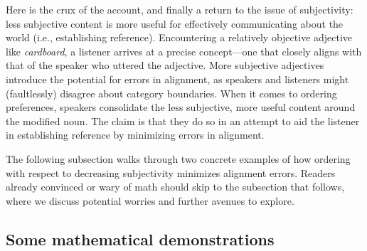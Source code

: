 \documentclass[preprint,authoryear]{elsarticle}\frenchspacing
\newcommand{\jd}[1]{\textcolor{Blue}{[jd: #1]}}
\begin{document}
Here is the crux of the account, and finally a return to the issue of subjectivity: less subjective content is more useful for effectively communicating about the world (i.e., establishing reference). %
Encountering a relatively objective adjective like \emph{cardboard}, a listener arrives at a precise concept---one that closely aligns with that of the speaker who uttered the adjective. More subjective adjectives introduce the potential for errors in alignment, as speakers and listeners might (faultlessly) disagree about category boundaries. When it comes to ordering preferences, speakers consolidate the less subjective, more useful content around the modified noun. The claim is that they do so in an attempt to aid the listener in establishing reference by minimizing errors in alignment. 

The following subsection walks through two concrete examples of how ordering with respect to decreasing subjectivity minimizes alignment errors. Readers already convinced or wary of math should skip to the subsection that follows, where we discuss potential worries and further avenues to explore.

\subsection{Some mathematical demonstrations}
\end{document}
